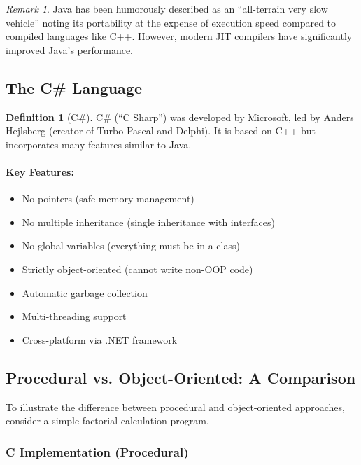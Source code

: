\documentclass[11pt, a4paper, notitlepage]{report}
\theoremstyle{definition}
\newtheorem{definition}[theorem]{Definition}
\theoremstyle{remark}
\newtheorem{remark}[theorem]{Remark}
\theoremstyle{definition}
\begin{document}
\begin{remark}
Java has been humorously described as an ``all-terrain very slow vehicle''  noting its portability at the expense of execution speed compared to compiled languages like C++. However, modern JIT compilers have significantly improved Java's performance.
\end{remark}

\subsection{The C\# Language}

\begin{definition}[C\#]
\label{def:ch1-csharp}
C\# (``C Sharp'') was developed by Microsoft, led by Anders Hejlsberg (creator of Turbo Pascal and Delphi). It is based on C++ but incorporates many features similar to Java.
\end{definition}

\paragraph{Key Features:}
\begin{itemize}
  \item No pointers (safe memory management)
  \item No multiple inheritance (single inheritance with interfaces)
  \item No global variables (everything must be in a class)
  \item Strictly object-oriented (cannot write non-OOP code)
  \item Automatic garbage collection
  \item Multi-threading support
  \item Cross-platform via .NET framework
\end{itemize}

\subsection{Procedural vs. Object-Oriented: A Comparison}

To illustrate the difference between procedural and object-oriented approaches, consider a simple factorial calculation program.

\subsubsection{C Implementation (Procedural)}
\end{document}
